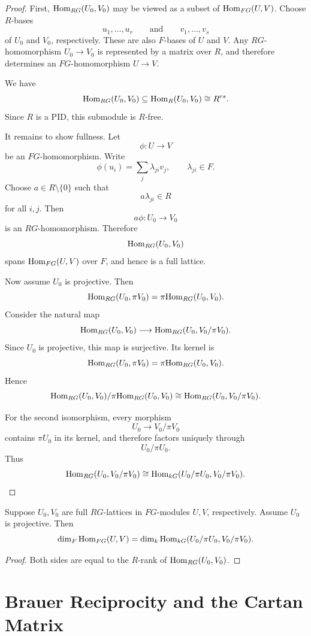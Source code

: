 \begin{proof}
First, \(\mathrm{Hom}_{RG}(U_0,V_0)\) may be viewed as a subset of \(\mathrm{Hom}_{FG}(U,V)\).
Choose \(R\)-bases
\[
u_1,\dots,u_r
\qquad\text{and}\qquad
v_1,\dots,v_s
\]
of \(U_0\) and \(V_0\), respectively. These are also \(F\)-bases of \(U\) and \(V\).
Any \(RG\)-homomorphism \(U_0\to V_0\) is represented by a matrix over \(R\), and
therefore determines an \(FG\)-homomorphism \(U\to V\).

We have
\[
\mathrm{Hom}_{RG}(U_0,V_0)\subseteq \mathrm{Hom}_R(U_0,V_0)\cong R^{rs}.
\]
Since \(R\) is a PID, this submodule is \(R\)-free.

It remains to show fullness. Let
\[
\phi:U\to V
\]
be an \(FG\)-homomorphism. Write
\[
\phi(u_i)=\sum_j \lambda_{ji}v_j,
\qquad
\lambda_{ji}\in F.
\]
Choose \(a\in R\setminus\{0\}\) such that
\[
a\lambda_{ji}\in R
\]
for all \(i,j\). Then
\[
a\phi:U_0\to V_0
\]
is an \(RG\)-homomorphism. Therefore
\[
\mathrm{Hom}_{RG}(U_0,V_0)
\]
spans \(\mathrm{Hom}_{FG}(U,V)\) over \(F\), and hence is a full lattice.

Now assume \(U_0\) is projective. Then
\[
\mathrm{Hom}_{RG}(U_0,\pi V_0)=\pi\mathrm{Hom}_{RG}(U_0,V_0).
\]
Consider the natural map
\[
\mathrm{Hom}_{RG}(U_0,V_0)
\longrightarrow
\mathrm{Hom}_{RG}(U_0,V_0/\pi V_0).
\]
Since \(U_0\) is projective, this map is surjective. Its kernel is
\[
\mathrm{Hom}_{RG}(U_0,\pi V_0)=\pi\mathrm{Hom}_{RG}(U_0,V_0).
\]
Hence
\[
\mathrm{Hom}_{RG}(U_0,V_0)/\pi\mathrm{Hom}_{RG}(U_0,V_0)
\cong
\mathrm{Hom}_{RG}(U_0,V_0/\pi V_0).
\]

For the second isomorphism, every morphism
\[
U_0\to V_0/\pi V_0
\]
contains \(\pi U_0\) in its kernel, and therefore factors uniquely through
\[
U_0/\pi U_0.
\]
Thus
\[
\mathrm{Hom}_{RG}(U_0,V_0/\pi V_0)
\cong
\mathrm{Hom}_{kG}(U_0/\pi U_0,V_0/\pi V_0).
\]
\end{proof}

\begin{corollary}
Suppose \(U_0,V_0\) are full \(RG\)-lattices in \(FG\)-modules \(U,V\), respectively.
Assume \(U_0\) is projective. Then
\[
\operatorname{dim}_F\mathrm{Hom}_{FG}(U,V)
=
\operatorname{dim}_k\mathrm{Hom}_{kG}(U_0/\pi U_0,V_0/\pi V_0).
\]
\end{corollary}

\begin{proof}
Both sides are equal to the \(R\)-rank of \(\mathrm{Hom}_{RG}(U_0,V_0)\).
\end{proof}

\section{Brauer Reciprocity and the Cartan Matrix}

